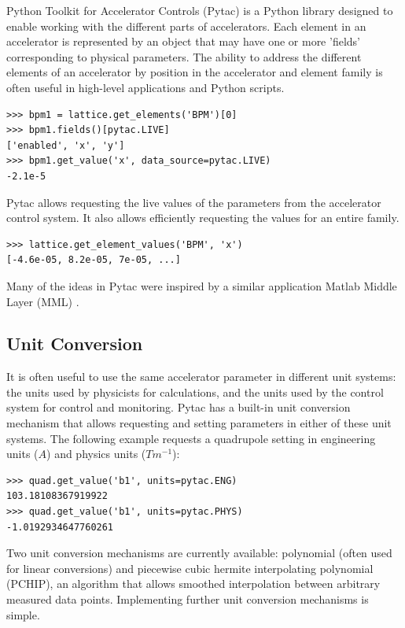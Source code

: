 \documentclass[a4paper,
               keeplastbox,   %
               ]{jacow}
\begin{document}
Python Toolkit for Accelerator Controls (Pytac) is a Python library designed to
enable working with the different parts of accelerators. Each element in an
accelerator is represented by an object that may have one or more 'fields' 
corresponding to physical parameters. The ability to address the different 
elements of an accelerator by position in the accelerator and element family
is often useful in high-level applications and Python scripts.

\begin{lstlisting}
>>> bpm1 = lattice.get_elements('BPM')[0]
>>> bpm1.fields()[pytac.LIVE]
['enabled', 'x', 'y']
>>> bpm1.get_value('x', data_source=pytac.LIVE)
-2.1e-5
\end{lstlisting}

 Pytac allows requesting the live values of the parameters from the accelerator
control system. It also allows efficiently requesting the values for an entire
family.

\begin{lstlisting}
>>> lattice.get_element_values('BPM', 'x')
[-4.6e-05, 8.2e-05, 7e-05, ...]
\end{lstlisting}

Many of the ideas in Pytac were inspired by a similar application Matlab Middle
Layer (MML) \cite{mml}.

\subsection{Unit Conversion}

It is often useful to use the same accelerator parameter in different unit systems:
the units used by physicists for calculations, and the units used by the control
system for control and monitoring. Pytac has a built-in unit conversion mechanism
that allows requesting and setting parameters in either of these unit systems. The
following example requests a quadrupole setting in engineering units ($A$) and
physics units ($Tm^{-1}$):

\begin{lstlisting}
>>> quad.get_value('b1', units=pytac.ENG)
103.18108367919922
>>> quad.get_value('b1', units=pytac.PHYS)
-1.0192934647760261
\end{lstlisting}

Two unit conversion mechanisms are currently available: polynomial (often used for 
linear conversions) and piecewise cubic hermite interpolating polynomial (PCHIP),
an algorithm that allows smoothed interpolation between arbitrary measured data
points. Implementing further unit conversion mechanisms is simple.
\end{document}
